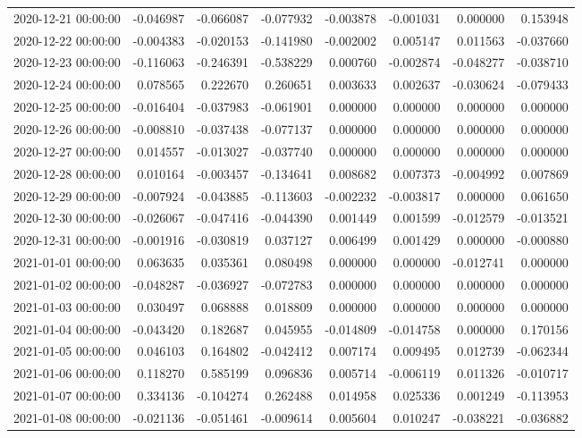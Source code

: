 \begin{tabular}{lrrrrrrr}
2020-12-21 00:00:00 & -0.046987 & -0.066087 & -0.077932 & -0.003878 & -0.001031 & 0.000000 & 0.153948 \\
2020-12-22 00:00:00 & -0.004383 & -0.020153 & -0.141980 & -0.002002 & 0.005147 & 0.011563 & -0.037660 \\
2020-12-23 00:00:00 & -0.116063 & -0.246391 & -0.538229 & 0.000760 & -0.002874 & -0.048277 & -0.038710 \\
2020-12-24 00:00:00 & 0.078565 & 0.222670 & 0.260651 & 0.003633 & 0.002637 & -0.030624 & -0.079433 \\
2020-12-25 00:00:00 & -0.016404 & -0.037983 & -0.061901 & 0.000000 & 0.000000 & 0.000000 & 0.000000 \\
2020-12-26 00:00:00 & -0.008810 & -0.037438 & -0.077137 & 0.000000 & 0.000000 & 0.000000 & 0.000000 \\
2020-12-27 00:00:00 & 0.014557 & -0.013027 & -0.037740 & 0.000000 & 0.000000 & 0.000000 & 0.000000 \\
2020-12-28 00:00:00 & 0.010164 & -0.003457 & -0.134641 & 0.008682 & 0.007373 & -0.004992 & 0.007869 \\
2020-12-29 00:00:00 & -0.007924 & -0.043885 & -0.113603 & -0.002232 & -0.003817 & 0.000000 & 0.061650 \\
2020-12-30 00:00:00 & -0.026067 & -0.047416 & -0.044390 & 0.001449 & 0.001599 & -0.012579 & -0.013521 \\
2020-12-31 00:00:00 & -0.001916 & -0.030819 & 0.037127 & 0.006499 & 0.001429 & 0.000000 & -0.000880 \\
2021-01-01 00:00:00 & 0.063635 & 0.035361 & 0.080498 & 0.000000 & 0.000000 & -0.012741 & 0.000000 \\
2021-01-02 00:00:00 & -0.048287 & -0.036927 & -0.072783 & 0.000000 & 0.000000 & 0.000000 & 0.000000 \\
2021-01-03 00:00:00 & 0.030497 & 0.068888 & 0.018809 & 0.000000 & 0.000000 & 0.000000 & 0.000000 \\
2021-01-04 00:00:00 & -0.043420 & 0.182687 & 0.045955 & -0.014809 & -0.014758 & 0.000000 & 0.170156 \\
2021-01-05 00:00:00 & 0.046103 & 0.164802 & -0.042412 & 0.007174 & 0.009495 & 0.012739 & -0.062344 \\
2021-01-06 00:00:00 & 0.118270 & 0.585199 & 0.096836 & 0.005714 & -0.006119 & 0.011326 & -0.010717 \\
2021-01-07 00:00:00 & 0.334136 & -0.104274 & 0.262488 & 0.014958 & 0.025336 & 0.001249 & -0.113953 \\
2021-01-08 00:00:00 & -0.021136 & -0.051461 & -0.009614 & 0.005604 & 0.010247 & -0.038221 & -0.036882 \\

\end{tabular}
